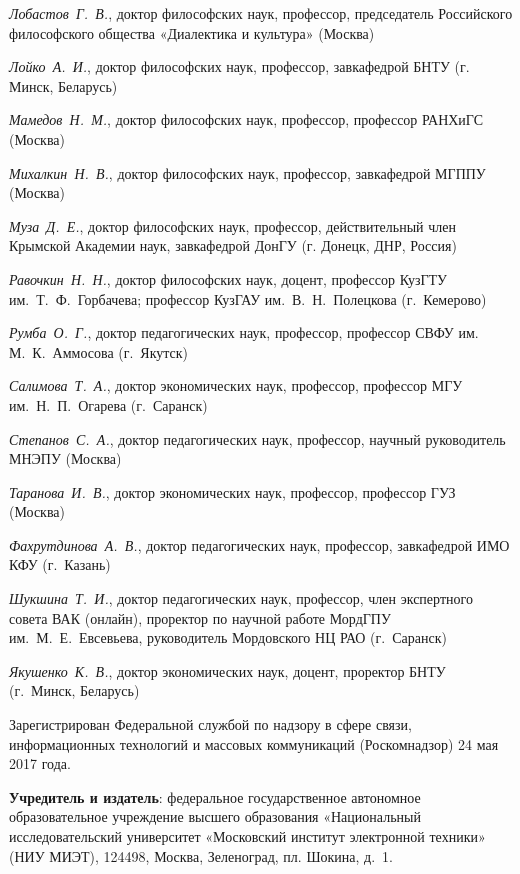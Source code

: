 \begin{multicols}{2}
\begin{flushleft}
    \noindent \textit{Лобастов Г. В.}, доктор философских наук, профессор, председатель Российского философского общества «Диалектика и культура» (Москва)
    
    \noindent \textit{Лойко А. И.}, доктор философских наук, профессор, завкафедрой БНТУ (г. Минск, Беларусь)
    
    \noindent \textit{Мамедов Н. М.}, доктор философских наук, профессор, профессор РАНХиГС (Москва)
    
    \noindent \textit{Михалкин Н. В.}, доктор философских наук, профессор, завкафедрой МГППУ (Москва)
    
    \noindent \textit{Муза Д. Е.}, доктор философских наук, профессор, действительный член Крымской Академии наук, завкафедрой ДонГУ (г. Донецк, ДНР, Россия) 
    
    \noindent \textit{Равочкин Н. Н.}, доктор философских наук, доцент, профессор КузГТУ им. Т. Ф. Горбачева; профессор КузГАУ им. В. Н. Полецкова (г. Кемерово)
    
    \noindent \textit{Румба О. Г.}, доктор педагогических наук, профессор, профессор СВФУ им. М. К. Аммосова (г. Якутск)
    
    \noindent \textit{Салимова Т. А.}, доктор экономических наук, профессор, профессор МГУ им. Н. П. Огарева (г. Саранск)
    
    \noindent \textit{Степанов С. А.}, доктор педагогических наук, профессор, научный руководитель МНЭПУ (Москва)
    
    \noindent \textit{Таранова И. В.}, доктор экономических наук, профессор, профессор ГУЗ (Москва)
   
    \noindent \textit{Фахрутдинова А. В.}, доктор педагогических наук, профессор, завкафедрой ИМО КФУ (г. Казань)
    
    \noindent \textit{Шукшина Т. И.}, доктор педагогических наук, профессор, член экспертного совета ВАК (онлайн), проректор по научной работе МордГПУ им. М. Е. Евсевьева, руководитель Мордовского НЦ РАО (г. Саранск)
    
    \noindent \textit{Якушенко К. В.}, доктор экономических наук, доцент, проректор БНТУ (г. Минск, Беларусь)
\end{flushleft}    
\end{multicols}

\begin{flushleft}
\scriptsize
Зарегистрирован Федеральной службой по надзору в сфере связи, информационных технологий
и массовых коммуникаций (Роскомнадзор) 24 мая 2017 года.


\textbf{Учредитель и издатель}: федеральное государственное автономное образовательное учреждение
высшего образования «Национальный исследовательский университет «Московский институт
электронной техники» (НИУ МИЭТ), 124498, Москва, Зеленоград, пл. Шокина, д. 1.
\end{flushleft}


